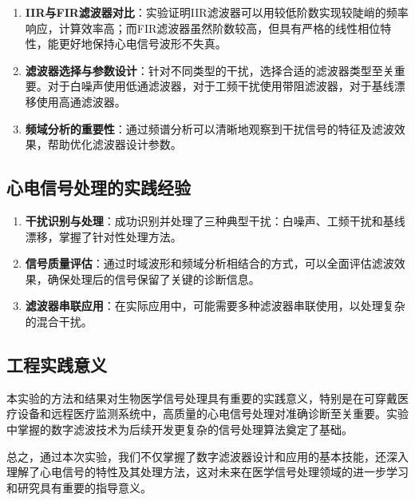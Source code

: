 \documentclass[12pt,hyperref,a4paper,UTF8]{ctexart}
\begin{document}
\begin{enumerate}
    \item \textbf{IIR与FIR滤波器对比}：实验证明IIR滤波器可以用较低阶数实现较陡峭的频率响应，计算效率高；而FIR滤波器虽然阶数较高，但具有严格的线性相位特性，能更好地保持心电信号波形不失真。
    
    \item \textbf{滤波器选择与参数设计}：针对不同类型的干扰，选择合适的滤波器类型至关重要。对于白噪声使用低通滤波器，对于工频干扰使用带阻滤波器，对于基线漂移使用高通滤波器。
    
    \item \textbf{频域分析的重要性}：通过频谱分析可以清晰地观察到干扰信号的特征及滤波效果，帮助优化滤波器设计参数。
\end{enumerate}

\subsection{心电信号处理的实践经验}

\begin{enumerate}
    \item \textbf{干扰识别与处理}：成功识别并处理了三种典型干扰：白噪声、工频干扰和基线漂移，掌握了针对性处理方法。
    
    \item \textbf{信号质量评估}：通过时域波形和频域分析相结合的方式，可以全面评估滤波效果，确保处理后的信号保留了关键的诊断信息。
    
    \item \textbf{滤波器串联应用}：在实际应用中，可能需要多种滤波器串联使用，以处理复杂的混合干扰。
\end{enumerate}

\subsection{工程实践意义}

本实验的方法和结果对生物医学信号处理具有重要的实践意义，特别是在可穿戴医疗设备和远程医疗监测系统中，高质量的心电信号处理对准确诊断至关重要。实验中掌握的数字滤波技术为后续开发更复杂的信号处理算法奠定了基础。

总之，通过本次实验，我们不仅掌握了数字滤波器设计和应用的基本技能，还深入理解了心电信号的特性及其处理方法，这对未来在医学信号处理领域的进一步学习和研究具有重要的指导意义。
\end{document}
